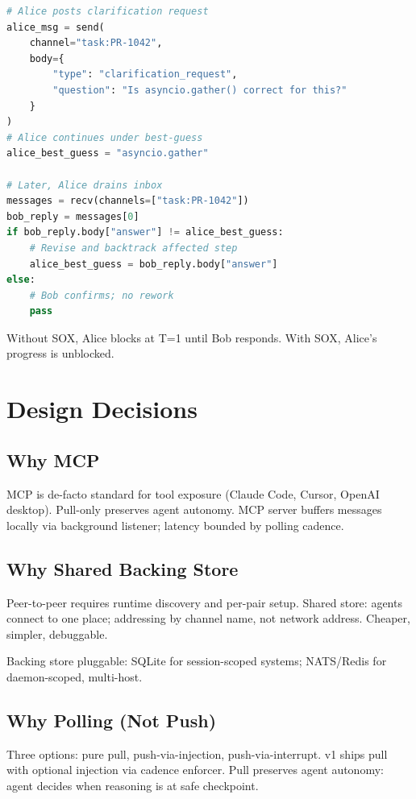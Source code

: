 \documentclass[11pt]{article}
\begin{document}
\begin{lstlisting}[language=Python]
# Alice posts clarification request
alice_msg = send(
    channel="task:PR-1042",
    body={
        "type": "clarification_request",
        "question": "Is asyncio.gather() correct for this?"
    }
)
# Alice continues under best-guess
alice_best_guess = "asyncio.gather"

# Later, Alice drains inbox
messages = recv(channels=["task:PR-1042"])
bob_reply = messages[0]
if bob_reply.body["answer"] != alice_best_guess:
    # Revise and backtrack affected step
    alice_best_guess = bob_reply.body["answer"]
else:
    # Bob confirms; no rework
    pass
\end{lstlisting}

Without SOX, Alice blocks at T=1 until Bob responds. With SOX, Alice's progress is unblocked.

\section{Design Decisions}

\subsection{Why MCP}

MCP is de-facto standard for tool exposure (Claude Code, Cursor, OpenAI desktop). Pull-only preserves agent autonomy. MCP server buffers messages locally via background listener; latency bounded by polling cadence.

\subsection{Why Shared Backing Store}

Peer-to-peer requires runtime discovery and per-pair setup. Shared store: agents connect to one place; addressing by channel name, not network address. Cheaper, simpler, debuggable.

Backing store pluggable: SQLite for session-scoped systems; NATS/Redis for daemon-scoped, multi-host.

\subsection{Why Polling (Not Push)}

Three options: pure pull, push-via-injection, push-via-interrupt. v1 ships pull with optional injection via cadence enforcer. Pull preserves agent autonomy: agent decides when reasoning is at safe checkpoint.
\end{document}
